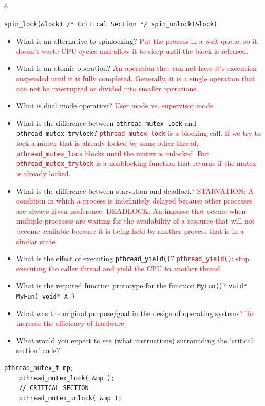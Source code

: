 \documentclass[9pt,landscape]{memoir}
\newcommand{\answer}[1]{\textcolor{red}{#1}}
\begin{document}
\begin{multicols}{6}
\begin{lstlisting}[style=cC++,aboveskip=1pt,belowskip=1pt]
    spin_lock(&lock) /* Critical Section */ spin_unlock(&lock)
\end{lstlisting}

\begin{itemize}
    \item What is an alternative to spinlocking?  \answer{Put the process in a wait queue, so it doesn't waste CPU cycles and allow it to sleep until the block is released.}
    \item What is an atomic operation? \answer{An operation that can not have it's execution suspended until it is fully completed. Generally, it is a single operation that can not be interrupted or divided into smaller operations.}
    \item What is dual mode operation? \answer{User mode vs. supervisor mode.}
    \item What is the difference between \verb$pthread_mutex_lock$ and \verb$pthread_mutex_trylock$? \answer{\texttt{pthread\_mutex\_lock} is a blocking call. If we try to lock a mutex that is already locked by some other thread, \texttt{pthread\_mutex\_lock} blocks until the mutex is unlocked. But \texttt{pthread\_mutex\_trylock} is a nonblocking function that returns if the mutex is already locked.}
    \item What is the difference between starvation and deadlock?  \answer{STARVATION: A condition in which a process is indefinitely delayed because other processes are always given preference. DEADLOCK: An impasse that occurs when multiple processes are waiting for the availability of a resource that will not become available because it is being held by another process that is in a similar state.}
    \item What is the effect of executing \verb$pthread_yield()$?  \answer{\texttt{pthread\_yield()}: stop executing the caller thread and yield the CPU to another thread}
    \item What is the required function prototype for the function \verb|MyFun()|? \verb|void* MyFun( void* X )|
    \item What was the original purpose/goal in the design of operating systems? \answer{To increase the efficiency of hardware.}
    \item What would you expect to see (what instructions) surrounding the `critical section' code?
\end{itemize}

\begin{lstlisting}[style=cC++,aboveskip=1pt,belowskip=1pt]
    pthread_mutex_t mp;
    pthread_mutex_lock( &mp );
    // CRITICAL SECTION
    pthread_mutex_unlock( &mp );
\end{lstlisting}




\end{multicols}
\end{document}
